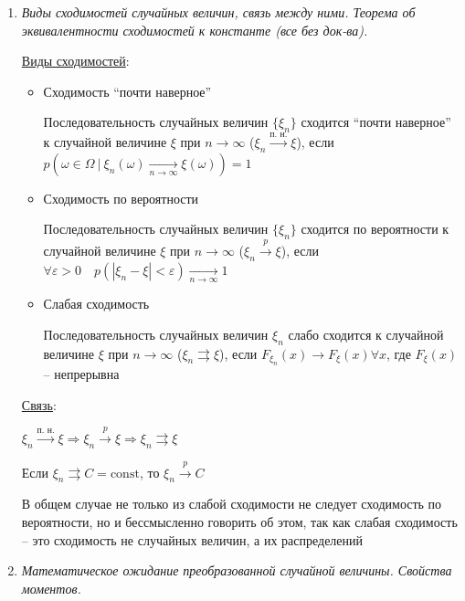 \begin{enumerate}
    \item \textit{Виды сходимостей случайных величин, связь между ними. Теорема об эквивалентности сходимостей к константе (все без док-ва).}

    \hyperlink{convergencetypes}{Виды сходимостей}:

    \begin{itemize}
        \item Сходимость \enquote{почти наверное}

        \Defs Последовательность случайных величин $\{\xi_n\}$ сходится \enquote{почти наверное} к случайной величине $\xi$ при $n \to \infty$ ($\xi_n \overset{\text{п. н.}}{\longrightarrow} \xi$), 
        если $p(\omega \in \Omega \ | \ \xi_n(\omega) \underset{n \to \infty}{\longrightarrow} \xi(\omega)) = 1$

        \item Сходимость по вероятности

        \Defs Последовательность случайных величин $\{\xi_n\}$ сходится по вероятности к случайной величине $\xi$ при $n \to \infty$
        ($\xi_n \overset{p}{\longrightarrow} \xi$), если $\forall \varepsilon > 0 \quad p(|\xi_n - \xi| < \varepsilon) \underset{n \to \infty}{\longrightarrow} 1$
        
        \item Слабая сходимость

        \Defs Последовательность случайных величин $\xi_n$ слабо сходится к случайной величине $\xi$ при $n \to \infty$
        ($\xi_n \rightrightarrows \xi$), если $F_{\xi_n}(x) \longrightarrow F_\xi(x) \forall x$, где $F_\xi(x)$ -- непрерывна
    \end{itemize}

    \hyperlink{connectionbetweenconvergencetypes}{Связь}: 

    \Ths $\xi_n \overset{\text{п. н.}}{\longrightarrow} \xi \Longrightarrow \xi_n \overset{p}{\longrightarrow} \xi \Longrightarrow \xi_n \rightrightarrows \xi$

    \Ths Если $\xi_n \rightrightarrows C = \mathrm{const}$, то $\xi_n \overset{p}{\longrightarrow} C$

    \Nota В общем случае не только из слабой сходимости не следует сходимость по вероятности, но и бессмысленно говорить
    об этом, так как слабая сходимость -- это сходимость не случайных величин, а их распределений

    \item \textit{Математическое ожидание преобразованной случайной величины. Свойства моментов.}
    

\end{enumerate}
